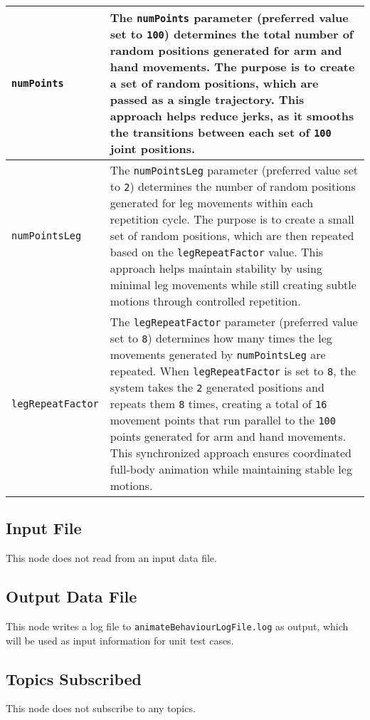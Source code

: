 \documentclass{CSSRforAfrica}
\begin{document}
\begin{longtable}{|>{\raggedright\arraybackslash}p{}|>{\raggedright\arraybackslash}p{}|}
    \texttt{numPoints} & The \texttt{numPoints} parameter (preferred value set to \texttt{100}) determines the total number of random positions generated for arm and hand movements. The purpose is to create a set of random positions, which are passed as a single trajectory. This approach helps reduce jerks, as it smooths the transitions between each set of \texttt{100} joint positions.
    \\ \hline
    
    \texttt{numPointsLeg} & The \texttt{numPointsLeg} parameter (preferred value set to \texttt{2}) determines the number of random positions generated for leg movements within each repetition cycle. The purpose is to create a small set of random positions, which are then repeated based on the \texttt{legRepeatFactor} value. This approach helps maintain stability by using minimal leg movements while still creating subtle motions through controlled repetition.
    \\ \hline
    
    \texttt{legRepeatFactor} & The \texttt{legRepeatFactor} parameter (preferred value set to \texttt{8}) determines how many times the leg movements generated by \texttt{numPointsLeg} are repeated. When \texttt{legRepeatFactor} is set to \texttt{8}, the system takes the \texttt{2} generated positions and repeats them \texttt{8} times, creating a total of \texttt{16} movement points that run parallel to the \texttt{100} points generated for arm and hand movements. This synchronized approach ensures coordinated full-body animation while maintaining stable leg motions.
\\ \hline

\end{longtable}


\subsection*{Input File}
This node does not read from an input data file.

\subsection*{Output Data File}
This node writes a log file to \texttt{animateBehaviourLogFile.log} as output, which will be used as input information for unit test cases.

\subsection*{Topics Subscribed}
This node does not subscribe to any topics.
\end{document}
